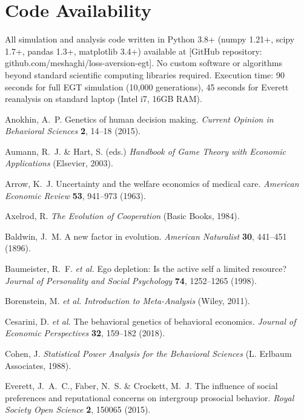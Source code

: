 \documentclass[11pt,twocolumn]{article}
\begin{document}
\section*{Code Availability}
All simulation and analysis code written in Python 3.8+ (numpy 1.21+, scipy 1.7+, pandas 1.3+, matplotlib 3.4+) available at [GitHub repository: github.com/meshaghi/loss-aversion-egt]. No custom software or algorithms beyond standard scientific computing libraries required. Execution time: 90 seconds for full EGT simulation (10,000 generations), 45 seconds for Everett reanalysis on standard laptop (Intel i7, 16GB RAM).


\begin{thebibliography}{30}

Anokhin, A.~P. Genetics of human decision making. {\em Current Opinion in Behavioral Sciences} {\bf 2}, 14--18 (2015).

Aumann, R.~J. \& Hart, S. (eds.) {\em Handbook of Game Theory with Economic Applications} (Elsevier, 2003).

Arrow, K.~J. Uncertainty and the welfare economics of medical care. {\em American Economic Review} {\bf 53}, 941--973 (1963).

Axelrod, R. {\em The Evolution of Cooperation} (Basic Books, 1984).

Baldwin, J.~M. A new factor in evolution. {\em American Naturalist} {\bf 30}, 441--451 (1896).

Baumeister, R.~F. {\em et al.} Ego depletion: Is the active self a limited resource? {\em Journal of Personality and Social Psychology} {\bf 74}, 1252--1265 (1998).

Borenstein, M. {\em et al.} {\em Introduction to Meta-Analysis} (Wiley, 2011).

Cesarini, D. {\em et al.} The behavioral genetics of behavioral economics. {\em Journal of Economic Perspectives} {\bf 32}, 159--182 (2018).

Cohen, J. {\em Statistical Power Analysis for the Behavioral Sciences} (L. Erlbaum Associates, 1988).

Everett, J.~A.~C., Faber, N.~S. \& Crockett, M.~J. The influence of social preferences and reputational concerns on intergroup prosocial behavior. {\em Royal Society Open Science} {\bf 2}, 150065 (2015).


\end{thebibliography}
\end{document}
